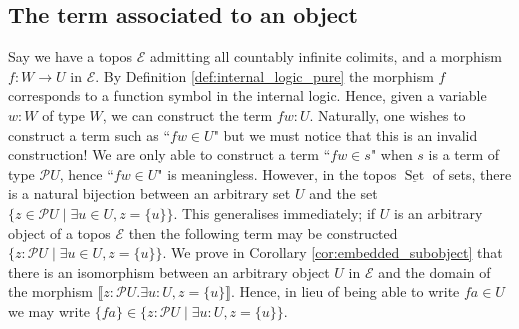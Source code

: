 \documentclass{birkjour}
\theoremstyle{plain}
\theoremstyle{definition}
\newcommand{\call}[1]{\mathcal{#1}}
\newcommand{\lto}{\longrightarrow}
\begin{document}
	\subsection{The term associated to an object}\label{sec:object_term}
	Say we have a topos $\call{E}$ admitting all countably infinite colimits, and a morphism $f: W \lto U$ in $\call{E}$. By Definition \ref{def:internal_logic_pure} the morphism $f$ corresponds to a function symbol in the internal logic. Hence, given a variable $w:W$ of type $W$, we can construct the term $fw:U$. Naturally, one wishes to construct a term such as ``$fw \in U$" but we must notice that this is an invalid construction! We are only able to construct a term ``$fw \in s$" when $s$ is a term of type $\call{P}U$, hence ``$fw \in U$" is meaningless. However, in the topos $\underline{\operatorname{Set}}$ of sets, there is a natural bijection between an arbitrary set $U$ and the set $\lbrace z \in \call{P}U \mid \exists u \in U, z = \lbrace u \rbrace \rbrace$. This generalises immediately; if $U$ is an arbitrary object of a topos $\call{E}$ then the following term may be constructed $\lbrace z: \call{P}U \mid \exists u \in U, z = \lbrace u \rbrace \rbrace$. We prove in Corollary \ref{cor:embedded_subobject} that there is an isomorphism between an arbitrary object $U$ in $\call{E}$ and the domain of the morphism $\llbracket z: \call{P}U. \exists u:U, z = \lbrace u \rbrace \rrbracket$.  Hence, in lieu of being able to write $fa \in U$ we may write $\lbrace fa\rbrace \in \lbrace z: \call{P}U \mid \exists u : U, z = \lbrace u \rbrace \rbrace$.
	
\end{document}
